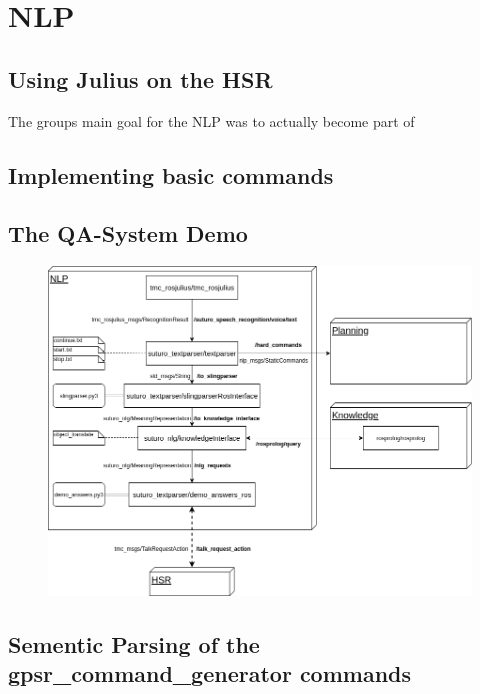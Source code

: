 \documentclass[main.tex]{subfiles}
\begin{document}
	
	\chapter{NLP}
    \section{Using Julius on the HSR}
        The groups main goal for the NLP was to actually become part of 
    \section{Implementing basic commands}
    \section{The QA-System Demo}   
    
        \begin{figure}[H]
            \centering
            \includegraphics[width=1.2\linewidth]{architecture/nlp}
            \caption{}
            \label{fig:nlp}
        \end{figure}

    \section{Sementic Parsing of the gpsr\_command\_generator commands}
    
    	
\end{document}
